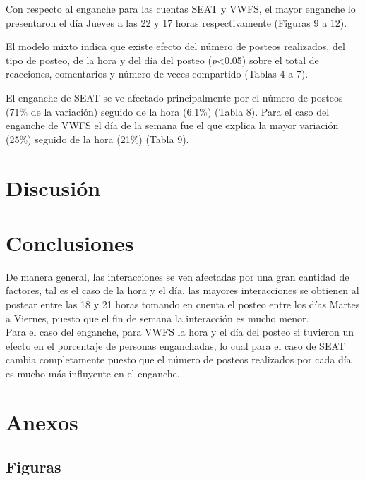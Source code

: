 \documentclass[a4paper,10pt]{article}
\begin{document}
Con respecto al  enganche para las cuentas SEAT y VWFS, el
mayor enganche lo presentaron el día Jueves a las 22 y 17 horas
respectivamente (Figuras 9 a 12).

El modelo mixto indica  que existe efecto del número
de posteos realizados, del tipo de posteo, de la hora y
del día del posteo (\textit{p}<0.05)  sobre el
total de reacciones, comentarios y número de veces compartido (Tablas 4 a 7).

El enganche de SEAT se ve afectado principalmente por
el número de posteos (71\% de la variación) seguido de 
la hora (6.1\%) (Tabla 8). Para el caso del enganche de VWFS el día de la
semana fue el que explica la mayor variación (25\%) seguido
de la hora (21\%) (Tabla 9).







\section{Discusión}

\section{Conclusiones}
De manera general, las interacciones se ven afectadas por una gran 
cantidad de factores, tal es el caso de la hora y el día, 
las mayores interacciones se obtienen 
al postear entre las 18 y 21 horas tomando en cuenta el
posteo entre los días Martes a Viernes, puesto que el fin de 
semana la interacción es mucho menor.\\
Para el caso del enganche, para VWFS la hora y el día
del posteo si tuvieron un efecto en el porcentaje de personas  enganchadas,
lo cual para el caso de SEAT cambia completamente
puesto que el número de posteos realizados por cada día
es mucho más influyente en el enganche.



\section{Anexos}
\subsection{Figuras}
\end{document}
